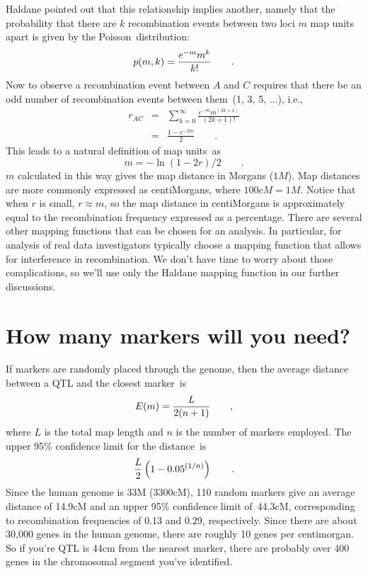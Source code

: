 Haldane pointed out that this relationship implies another, namely
that the probability that there are $k$ recombination events between
two loci $m$ map units apart is given by the Poisson~distribution:
\[
p(m,k) = {e^{-m} m^k \over k!} \qquad .
\]
Now to observe a recombination event between $A$ and $C$ requires that
there be an odd number of recombination events between them~(1, 3, 5,
$\ldots$), i.e.,
\begin{eqnarray*}
r_{AC} &=& \sum_{k=0}^\infty \frac{e^{-m} m^{(2k+1)}}{(2k+1)!} \\
       &=& \frac{1 - e^{-2m}}{2} \qquad .
\end{eqnarray*}
This leads to a natural definition of map units~as
\[
m = -\ln (1-2r) /2 \qquad .
\]
$m$ calculated in this way gives the map distance in Morgans
($1M$). Map distances are more commonly expressed as centiMorgans,
where $100cM = 1M$. Notice that when $r$ is small, $r \approx m$, so
the map distance in centiMorgans is approximately equal to the
recombination frequency expressed as a percentage. There are several
other mapping functions that can be chosen for an analysis. In
particular, for analysis of real data investigators typically choose a
mapping function that allows for interference in recombination. We
don't have time to worry about those complications, so we'll use only
the Haldane mapping function in our further discussions.

\section*{How many markers will you need?}

If markers are randomly placed through the genome, then the average
distance between a QTL and the closest marker~is
\[
E(m) = {L \over 2(n+1)} \qquad ,
\]
where $L$ is the total map length and $n$ is the number of markers
employed. The upper 95\% confidence limit for the distance~is
\[
{L \over 2}\left(1 - 0.05^{(1/n)}\right) \qquad .
\]
Since the human genome is 33M (3300cM), 110 random markers give an
average distance of 14.9cM and an upper 95\% confidence limit
of~44.3cM, corresponding to recombination frequencies of 0.13 and
0.29, respectively. Since there are about 30,000 genes in the human
genome, there are roughly 10 genes per centimorgan. So if you're QTL
is 44cm from the nearest marker, there are probably over 400 genes in
the chromosomal segment you've identified.

